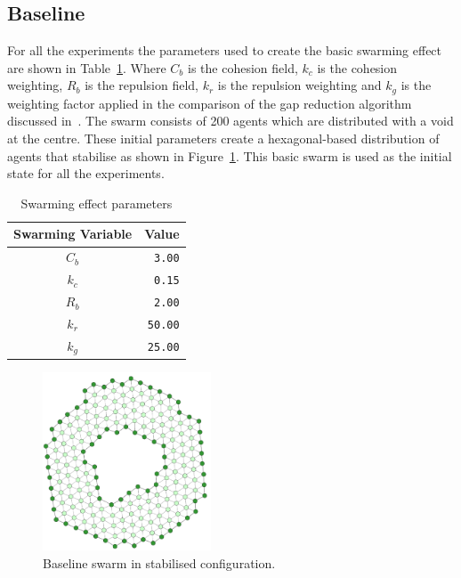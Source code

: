 \documentclass[12pt,a4paper]{IEEEtran}
\begin{document}
\subsection{Baseline}
For all the experiments the parameters used to create the basic swarming effect are shown in Table~\ref{tab:swarmingEffect}. Where $C_b$ is the cohesion field, $k_c$ is the cohesion weighting, $R_b$ is the repulsion field, $k_r$ is the repulsion weighting and $k_g$ is the weighting factor applied in the comparison of the gap reduction algorithm discussed in~\cite{eliot2019void}. The swarm consists of 200 agents which are distributed with a void at the centre. These initial parameters create a hexagonal-based distribution of agents that stabilise as shown in Figure~\ref{fig:baselineSwarm}. This basic swarm is used as the initial state for all the experiments. 
 \begin{table}[h]
	\centering
	\tiny
	\begin{tabular}{|c|r|}
		\hline
		\rowcolor[HTML]{000000} 
		{\color[HTML]{FFFFFF} Swarming Variable} & {\color[HTML]{FFFFFF} Value} \\ \hline
		$C_b$ & \texttt{3.00} \\ \hline
		$k_c$ & \texttt{0.15}  \\ \hline
		$R_b$ & \texttt{2.00} \\ \hline
		$k_r$ & \texttt{50.00} \\ \hline
		$k_g$ & \texttt{25.00} \\ \hline
	\end{tabular}
  	\caption{Swarming effect parameters}
  	\label{tab:swarmingEffect}
\end{table}

\begin{figure}[H]
	\begin{center}
		\includegraphics[width=5cm]{figures/exp1Start}
	\end{center}
	\caption{Baseline swarm in stabilised configuration. \label{fig:baselineSwarm}}
\end{figure}
\end{document}

